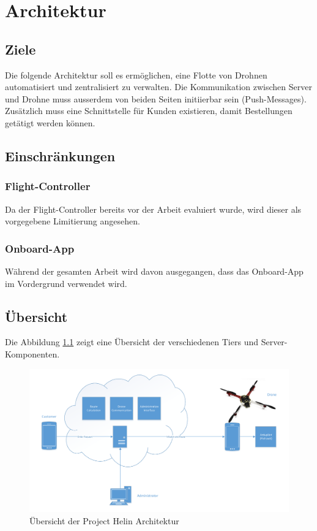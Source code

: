 \chapter{Architektur}

\section{Ziele}

Die folgende Architektur soll es ermöglichen, eine Flotte von Drohnen automatisiert und zentralisiert zu verwalten. Die Kommunikation zwischen Server und Drohne muss ausserdem von beiden Seiten initiierbar sein (Push-Messages). Zusätzlich muss eine Schnittstelle für Kunden existieren, damit Bestellungen getätigt werden können. 


\section{Einschränkungen}

\subsection{Flight-Controller}
Da der \Gls{Flight-Controller} bereits vor der Arbeit evaluiert wurde, wird dieser als vorgegebene Limitierung angesehen.

\subsection{Onboard-App}
Während der gesamten Arbeit wird davon ausgegangen, dass das Onboard-App im Vordergrund verwendet wird.


\section{Übersicht}

Die Abbildung \ref{fig:architecture-overview} zeigt eine Übersicht der verschiedenen Tiers und Server-Komponenten.

\begin{figure}[H]
	\centering
	\includegraphics[width=1\textwidth]{images/Overview-Diagram.pdf}
	\caption{Übersicht der Project Helin Architektur }
	\label{fig:architecture-overview}
\end{figure}


